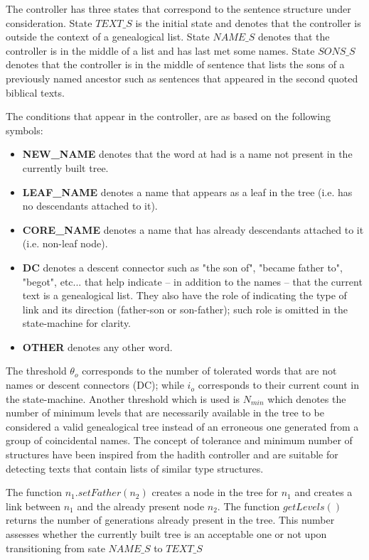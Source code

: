 \documentclass[11pt]{article}
\begin{document}
The controller has three states that correspond to 
the sentence structure under consideration. 
State $\mathit{TEXT\_S}$ is the initial state and denotes 
that the controller is outside the context of a genealogical list.
State $\mathit{NAME\_S}$ denotes that the controller is in
the middle of a list and has last met some names. 
State $\mathit{SONS\_S}$ denotes that the controller is in
the middle of sentence that lists the sons of a previously named ancestor such as sentences that appeared in the second quoted biblical texts. 


The conditions that appear in the controller, are as based on the following symbols:
\begin{itemize}
\item {\bf NEW\_NAME} denotes that the word at had is a name not present in the
	currently built tree.
\item {\bf LEAF\_NAME} denotes a name that appears as a leaf in the tree (i.e. has no
	descendants attached to it).
\item {\bf CORE\_NAME} denotes a name that has already descendants attached to it (i.e. 
	non-leaf node).
\item {\bf DC} denotes a descent connector such as "the son of", "became father to",
	"begot", etc... that help indicate -- in addition to the names -- that the current text
	is a genealogical list. They also have the role of indicating the type of link and its 
	direction (father-son or son-father); such role is omitted in the state-machine for clarity.
\item {\bf OTHER} denotes any other word.
\end{itemize}
The threshold $\theta_{\mathit{o}}$ 
corresponds to the number of tolerated words that are not names 
or descent connectors (DC); while 
$i_{\mathit{o}}$ corresponds to their current count in the state-machine. 
Another threshold which is used is $\mathit{N_{min}}$ which denotes the number of minimum
levels that are necessarily available in the tree to be considered a valid genealogical
tree instead of an erroneous one generated from a group of coincidental names. The
concept of tolerance and minimum number of structures have been inspired from the
hadith controller and are suitable for detecting texts that contain lists of similar
type structures.

The function $\mathit{n_1.setFather(n_2)}$ creates a node in the tree 
for $\mathit{n_1}$ and creates
a link between $\mathit{n_1}$ and the already present node $\mathit{n_2}$. 
The function $\mathit{getLevels()}$ 
returns the number of generations already present in the tree. This number
assesses whether the currently built tree is an acceptable one or not upon
transitioning from sate $\mathit{NAME\_S}$ to $\mathit{TEXT\_S}$
\end{document}
